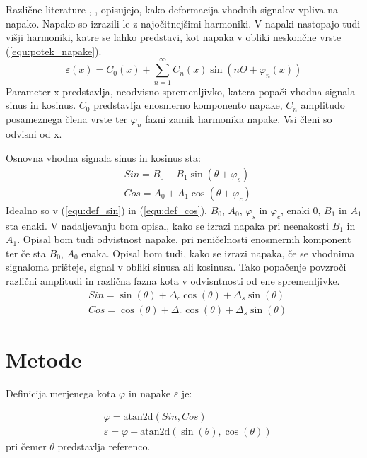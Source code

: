 \documentclass[a4paper]{article}
\begin{document}
Različne literature \cite{RLS1}, \cite{RLS2}, \cite{RLS3} opisujejo, kako deformacija vhodnih signalov vpliva na napako. Napako so izrazili le z najočitnejšimi harmoniki. V napaki nastopajo tudi višji harmoniki, katre se lahko predstavi, kot napaka v obliki  neskončne vrste (\ref{equ:potek_napake}).
\begin{equation}
\label{equ:potek_napake}
\varepsilon(x) = C_0(x) + \sum_{n=1}^{\infty} C_n(x) \sin(n \Theta+ \varphi_n(x))
\end{equation}
Parameter x predstavlja, neodvisno spremenljivko, katera popači vhodna signala sinus in kosinus. $C_0$ predstavlja enosmerno komponento napake, $C_n$ amplitudo posameznega člena vrste ter $\varphi_n$ fazni zamik harmonika napake. Vsi členi so odvisni od x.

Osnovna vhodna signala sinus in kosinus sta:
\begin{eqnarray}
\label{equ:def_sin}
&Sin = B_{0} + B_1 \sin(\theta + \varphi_{s})\\
\label{equ:def_cos}
&Cos = A_{0} + A_1 \cos(\theta + \varphi_{c})
\end{eqnarray}
Idealno so v (\ref{equ:def_sin}) in (\ref{equ:def_cos}), $B_0$, $A_0$, $\varphi_{s}$ in $\varphi_{c}$, enaki 0, $B_1$ in $A_1$ sta enaki. V nadaljevanju bom opisal, kako se izrazi napaka pri neenakosti $B_1$ in $A_1$. Opisal bom tudi odvistnost napake, pri neničelnosti enosmernih komponent ter če sta $B_0$, $A_0$ enaka. Opisal bom tudi, kako se izrazi napaka, če se vhodnima signaloma prišteje, signal v obliki sinusa ali kosinusa. Tako popačenje povzroči različni amplitudi in različna fazna kota v odvisntnosti od ene spremenljivke. 
\begin{eqnarray}
\label{equ:def_eks_sin}
&Sin = \sin(\theta)+\Delta_c \cos(\theta)+\Delta_s \sin(\theta)\\
\label{equ:def_ek_cos}
&Cos =\cos(\theta)+\Delta_c \cos(\theta)+\Delta_s \sin(\theta)
\end{eqnarray}

\section{Metode}

Definicija merjenega kota $\varphi$ in  napake $\varepsilon$ je:

\begin{eqnarray}
\label{equ:def_kot}
&\varphi = \mathrm{atan2d}(Sin,Cos)\\
\label{equ:def_err}
&\varepsilon =\varphi - \mathrm{atan2d}(\sin(\theta),\cos(\theta))
\end{eqnarray}
pri čemer $\theta$ predstavlja referenco.
\end{document}
